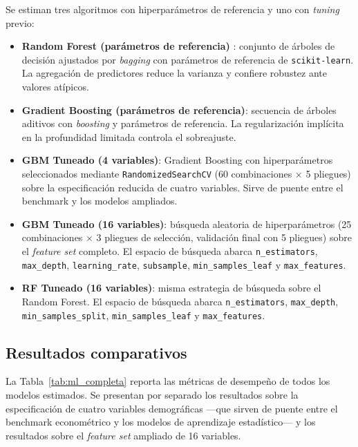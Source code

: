 \documentclass[12pt, a4paper]{article}
\newcommand{\citep}[1]{\cite{#1}}
\begin{document}
Se estiman tres algoritmos con hiperparámetros de referencia y uno con \textit{tuning} previo:

\begin{itemize}
    \item \textbf{Random Forest (parámetros de referencia)} \citep{informal:hastie}: conjunto de árboles de decisión ajustados por \textit{bagging} con parámetros de referencia de \texttt{scikit-learn}. La agregación de predictores reduce la varianza y confiere robustez ante valores atípicos.
    \item \textbf{Gradient Boosting (parámetros de referencia)}: secuencia de árboles aditivos con \textit{boosting} y parámetros de referencia. La regularización implícita en la profundidad limitada controla el sobreajuste.
    \item \textbf{GBM Tuneado (4 variables)}: Gradient Boosting con hiperparámetros seleccionados mediante \texttt{RandomizedSearchCV} (60 combinaciones × 5 pliegues) sobre la especificación reducida de cuatro variables. Sirve de puente entre el benchmark y los modelos ampliados.
    \item \textbf{GBM Tuneado (16 variables)}: búsqueda aleatoria de hiperparámetros (25 combinaciones × 3 pliegues de selección, validación final con 5 pliegues) sobre el \textit{feature set} completo. El espacio de búsqueda abarca \texttt{n\_estimators}, \texttt{max\_depth}, \texttt{learning\_rate}, \texttt{subsample}, \texttt{min\_samples\_leaf} y \texttt{max\_features}.
    \item \textbf{RF Tuneado (16 variables)}: misma estrategia de búsqueda sobre el Random Forest. El espacio de búsqueda abarca \texttt{n\_estimators}, \texttt{max\_depth}, \texttt{min\_samples\_split}, \texttt{min\_samples\_leaf} y \texttt{max\_features}.
\end{itemize}

\subsection{Resultados comparativos}\label{sec:ml_resultados}

La Tabla~\ref{tab:ml_completa} reporta las métricas de desempeño de todos los modelos estimados. Se presentan por separado los resultados sobre la especificación de cuatro variables demográficas —que sirven de puente entre el benchmark econométrico y los modelos de aprendizaje estadístico— y los resultados sobre el \textit{feature set} ampliado de 16 variables.
\end{document}

